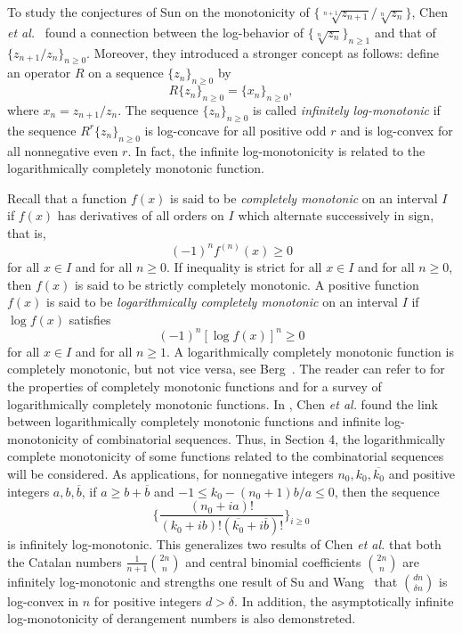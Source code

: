 \documentclass[12pt,reqno]{article}
\theoremstyle{definition}
\numberwithin{equation}{section}
\begin{document}
 To study the conjectures
of Sun on the monotonicity of
$\{\sqrt[n+1]{z_{n+1}}/\sqrt[n]{z_n}\}$, Chen {\it et
al.}~\cite{CGW1} found a connection between the log-behavior of
$\{\sqrt[n]{z_n}\}_{n\ge 1}$ and that of $\{{z_{n+1}}/{z_n}\}_{n\ge
0}$. Moreover, they introduced a stronger concept as follows: define
an operator $R$ on a sequence $\{z_n\}_{n\geq 0}$ by
$$R\{z_n\}_{n\geq 0}=\{x_n\}_{n\geq 0},$$ where $x_n = z_{n+1}/{z_n}$. The sequence
$\{z_n\}_{n\geq 0}$ is called {\it infinitely log-monotonic} if the
sequence $R^r\{z_n\}_{n\geq 0}$ is log-concave for all positive odd
$r$ and is log-convex for all nonnegative even $r$. In fact, the
infinite log-monotonicity is related to the logarithmically
completely monotonic function.


Recall that a function $f(x)$ is said to be {\it completely
monotonic} on an interval $I$ if $f(x)$ has derivatives of all
orders on $I$ which alternate successively in sign, that is,
$$(-1)^nf^{(n)}(x)\geq0$$
for all $x\in I$ and for all $n\geq 0$. If inequality is strict for
all $x\in I$ and for all $n\geq 0$, then $f(x)$ is said to be
strictly completely monotonic. A positive function $f(x)$ is said to
be {\it logarithmically completely monotonic} on an interval $I$ if
$\log f(x)$ satisfies
$$(-1)^n[\log f(x)]^{n}\geq0$$
for all $x\in I$ and for all $n\geq 1$. A logarithmically completely
monotonic function is completely monotonic, but not vice versa, see
Berg~\cite{Ber04}. The reader can refer to \cite{Widd46} for the
properties of completely monotonic functions and \cite{QL13} for a
survey of logarithmically completely monotonic functions. In
\cite{CGW1}, Chen {\it et al.} found the link between
logarithmically completely monotonic functions and infinite
log-monotonicity of combinatorial sequences. Thus, in Section 4, the
logarithmically complete monotonicity of some functions related to
the combinatorial sequences will be considered. As applications, for
nonnegative integers $n_{0},k_{0},\overline{k_0}$ and  positive
integers $a,b,\overline{b}$, if $a\geq b+\overline{b}$ and $-1\leq
k_0-(n_0+1)b/a\leq0$, then the sequence
$$\{\frac{(n_{0}+ia)!}{(k_0+ib)!(\overline{k_0}+i\overline{b})!}\}_{i\geq0}$$
is infinitely log-monotonic. This generalizes two results of Chen
{\it et al.} \cite{CGW1} that both the Catalan numbers
$\frac{1}{n+1}\binom{2n}{n}$ and central binomial coefficients
$\binom{2n}{n}$ are infinitely log-monotonic and strengths one
result of Su and Wang~\cite{SW08} that $\binom{dn}{\delta n}$ is
log-convex in $n$ for positive integers $d>\delta$. In addition, the
asymptotically infinite log-monotonicity of derangement numbers is
also demonstreted.
\end{document}
